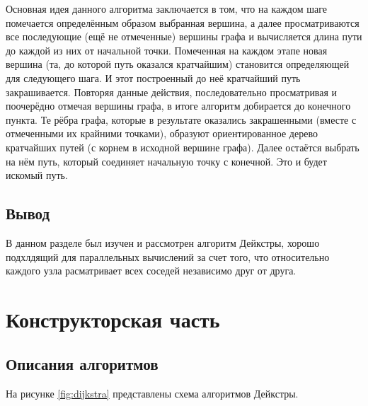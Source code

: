 \documentclass[a4paper,14pt, unknownkeysallowed]{extreport}
\begin{document}
Основная идея данного алгоритма заключается в том, что на каждом шаге помечается определённым образом выбранная вершина, а далее просматриваются все последующие (ещё не отмеченные) вершины графа и вычисляется длина пути до каждой из них от начальной
точки.
Помеченная на каждом этапе новая вершина (та, до которой путь оказался кратчайшим) становится определяющей для следующего шага. 
И этот построенный до неё кратчайший путь закрашивается.
Повторяя данные действия, последовательно просматривая и поочерёдно отмечая вершины графа, в итоге алгоритм добирается до конечного пункта. 
Те рёбра графа, которые в результате оказались закрашенными (вместе с отмеченными их крайними точками), образуют ориентированное дерево кратчайших путей (с корнем в исходной вершине графа). 
Далее остаётся выбрать на нём путь, который соединяет начальную точку с конечной. 
Это и будет искомый путь.

\section*{Вывод}
	
В данном разделе был изучен и рассмотрен алгоритм Дейкстры, хорошо подхлдящий для параллельных вычислений за счет того, что относительно каждого узла расматривает всех соседей независимо друг от друга.
	
\chapter{Конструкторская часть}

\section*{Описания алгоритмов}
	
На рисунке \ref{fig:dijkstra} представлены схема алгоритмов Дейкстры.
\end{document}
